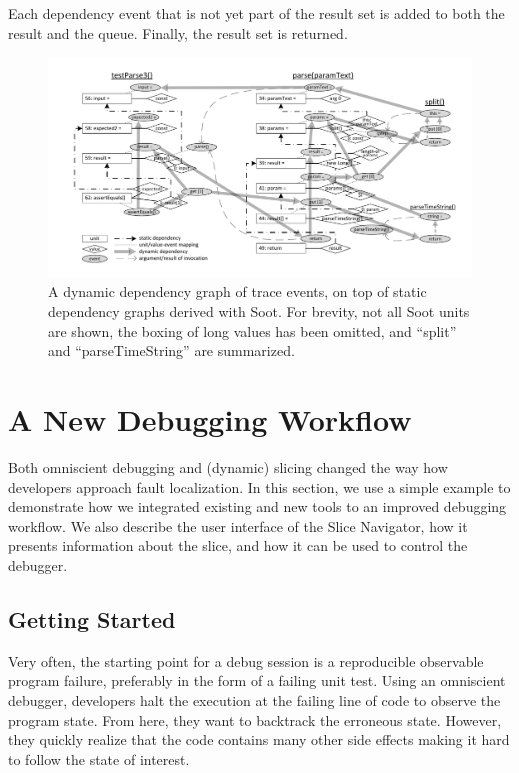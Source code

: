 Each dependency event that is not yet part of the result set is added to both the result and the queue.
Finally, the result set is returned.

\begin{figure}[t]
\centering
\includegraphics[width=.90\linewidth, clip, trim=12mm 7mm 8mm 7mm]{img/graph}
\caption{A dynamic dependency graph of trace events, on top of static dependency graphs derived with Soot. For brevity, not all Soot units are shown, the boxing of long values has been omitted, and ``split'' and ``parseTimeString'' are summarized.}
\label{fig:graph}
\end{figure}
\tmpEnd

\tmpStart

\section{A New Debugging Workflow}
\label{sec:workflow}

Both omniscient debugging and (dynamic) slicing changed the way how developers approach fault localization.
In this section, we use a simple example to demonstrate how we integrated existing and new tools to an improved debugging workflow.
We also describe the user interface of the Slice Navigator, how it presents information about the slice, and how it can be used to control the debugger.

\subsection{Getting Started}
\label{lst:example}

Very often, the starting point for a debug session is a reproducible observable program failure, preferably in the form of a failing unit test.
Using an omniscient debugger, developers halt the execution at the failing line of code to observe the program state.
From here, they want to backtrack the erroneous state.
However, they quickly realize that the code contains many other side effects making it hard to follow the state of interest.

